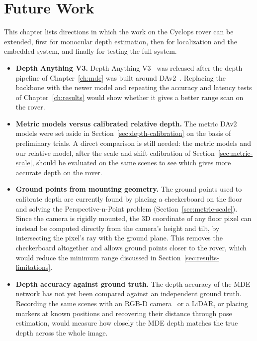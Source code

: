 \chapter{Future Work}
\label{ch:future-work}

This chapter lists directions in which the work on the Cyclops rover can be extended, first for
monocular depth estimation, then for localization and the embedded system, and finally for
testing the full system.

\begin{itemize}
  \item \textbf{Depth Anything V3.} Depth Anything V3~\cite{lin2026depthanything3} was released after the depth
  pipeline of Chapter~\ref{ch:mde} was built around DAv2~\cite{DepthAnythingV2}. Replacing the
  backbone with the newer model and repeating the accuracy and latency tests of
  Chapter~\ref{ch:results} would show whether it gives a better range scan on the rover.

  \item \textbf{Metric models versus calibrated relative depth.} The metric DAv2 models were set
  aside in Section~\ref{sec:depth-calibration} on the basis of preliminary trials. A direct
  comparison is still needed: the metric models and our relative model, after the scale and
  shift calibration of Section~\ref{sec:metric-scale}, should be evaluated on the same scenes to
  see which gives more accurate depth on the rover.

  \item \textbf{Ground points from mounting geometry.} The ground points used to calibrate depth
  are currently found by placing a checkerboard on the floor and solving the
  Perspective-n-Point problem (Section~\ref{sec:metric-scale}). Since the camera is rigidly
  mounted, the 3D coordinate of any floor pixel can instead be computed directly from the
  camera's height and tilt, by intersecting the pixel's ray with the ground plane. This removes
  the checkerboard altogether and allows ground points closer to the rover, which would reduce
  the minimum range discussed in Section~\ref{sec:results-limitations}.

  \item \textbf{Depth accuracy against ground truth.} The depth accuracy of the MDE network has
  not yet been compared against an independent ground truth. Recording the same scenes with an
  RGB-D camera~\cite{rgbd} or a LiDAR, or placing markers at known positions and recovering
  their distance through pose estimation, would measure how closely the MDE depth matches the
  true depth across the whole image.


\end{itemize}

